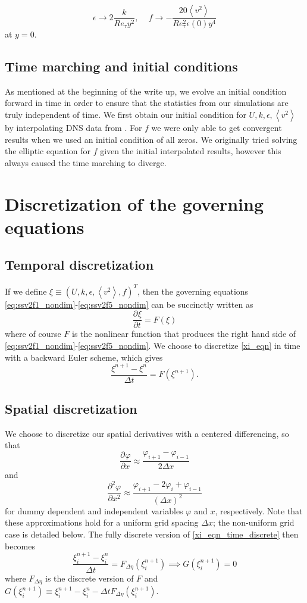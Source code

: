 \documentclass[a4paper,11pt]{article}
\newcommand{\chevron}[1]{\left\langle #1 \right\rangle}
\newcommand{\pderiv}[3][]{%
  \ensuremath{\frac{\partial^{#1} {#2}}{\partial {#3}^{#1}}}}
\newcommand{\ep}{\epsilon}
\begin{document}
\[
\epsilon \to 2\frac{k}{Re_{\tau}y^2}, \,\,\,\,\,\,\, f \to -\frac{20
\chevron{v^2} }{Re_\tau^2 \ep(0) y^4}
\]
at $y = 0$.  

\subsection{Time marching and initial conditions}
As mentioned at the beginning of the write up, we evolve an initial condition
forward in time in order to ensure that the statistics from our simulations are
truly independent of time. We first obtain our initial condition for $U, k, \ep,
\chevron{v^2}$ by interpolating DNS data from \cite{Lee}. For $f$ we were only
able to get convergent results when we used an initial condition of all zeros.
We originally tried solving the elliptic equation for $f$ given the initial
interpolated results, however this always caused the time marching to diverge.

\section{Discretization of the governing equations}
\subsection{Temporal discretization}
If we define $\xi \equiv (U, k, \ep, \chevron{v^2}, f)^T$, then the governing equations \eqref{eq:ssv2f1_nondim}-\eqref{eq:ssv2f5_nondim} can be succinctly written as 
\begin{equation}\label{xi_eqn}
\pderiv{\xi}{t} = F(\xi)
\end{equation}
where of course $F$ is the nonlinear function that produces the right hand side of \eqref{eq:ssv2f1_nondim}-\eqref{eq:ssv2f5_nondim}. We choose to discretize \eqref{xi_eqn} in time with a backward Euler scheme, which gives
\begin{equation}\label{xi_eqn_time_discrete}
\frac{\xi^{n+1} - \xi^n}{\Delta t} = F(\xi^{n+1}).
\end{equation}

\subsection{Spatial discretization}
We choose to discretize our spatial derivatives with a centered differencing, so that 
\[
\pderiv{\varphi}{x} \approx \frac{\varphi_{i+1}-\varphi_{i-1}}{2\Delta x} 
\]
and 
\[
\frac{\partial^2 \varphi}{\partial x^2} \approx \frac{ \varphi_{i+1} - 2\varphi_i + \varphi_{i-1} }{(\Delta x)^2} 
\]
for dummy dependent and independent variables $\varphi$ and $x$, respectively. Note that these approximations hold for a uniform grid spacing $\Delta x$; the non-uniform grid case is detailed below. The fully discrete version of \eqref{xi_eqn_time_discrete} then becomes 
\begin{equation}\label{xi_eqn_fully_discrete}
\frac{\xi_i^{n+1} - \xi_i^n}{\Delta t} = F_{\Delta \eta}(\xi_i^{n+1}) \implies G(\xi^{n+1}_i) = 0 
\end{equation}
where $F_{\Delta \eta}$ is the discrete version of $F$ and $G(\xi_i^{n+1}) \equiv \xi^{n+1}_i - \xi^n_i - \Delta t F_{\Delta \eta}(\xi_i^{n+1})$. 
\end{document}
